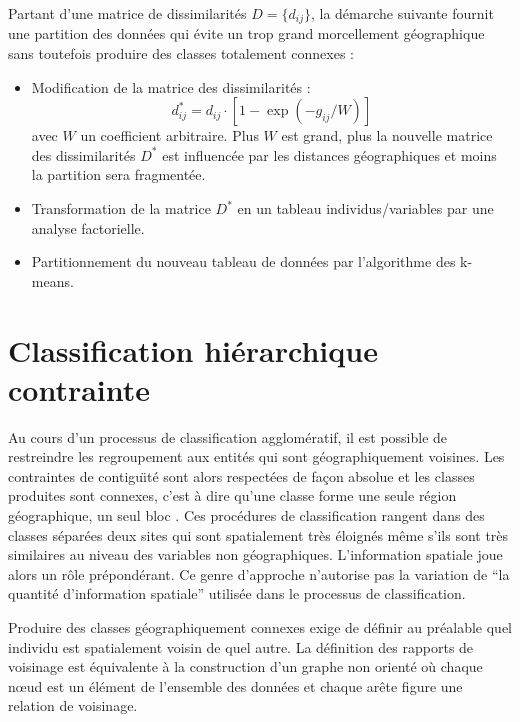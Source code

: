 \begin{ex}\cite{Oliver1989}
Partant d'une matrice de dissimilarit\'es $D=\{d_{ij}\}$, la 
d\'emarche suivante fournit une partition des donn\'ees qui 
\'evite un trop grand morcellement g\'eographique sans toutefois produire
des classes totalement connexes :
\begin{itemize}
\item  Modification de la matrice des dissimilarit\'es : 
\[
d^*_{ij}=d_{ij}\cdot [1-\exp{(-g_{ij}/W)}]
\]
avec $W$ un coefficient arbitraire. Plus $W$ est grand, plus
la nouvelle matrice des dissimilarit\'es $D^*$ est influenc\'ee
par les distances g\'eographiques et moins la partition sera fragment\'ee.

\item Transformation de la matrice $D^*$ en un tableau individus/variables
par une analyse factorielle.

\item Partitionnement du nouveau tableau de donn\'ees par l'algorithme des
k-means. 

\end{itemize}




\end{ex}

  
  

\section{Classification hi\'erarchique contrainte}
Au cours d'un processus de classification agglom\'eratif, il est possible 
de  restreindre les regroupement aux entit\'es qui sont
g\'eographiquement voisines. Les contraintes de contigu\"{\i}t\'e
sont alors respect\'ees de fa\c{c}on absolue et les classes produites
sont connexes, c'est \`a dire qu'une classe forme une seule r\'egion
g\'eographique, un seul bloc \cite{Legendre1987,Lebart1978,Openshaw1977}.
Ces proc\'edures de classification rangent dans des classes s\'epar\'ees
deux sites qui sont spatialement tr\`es \'eloign\'es m\^eme s'ils
sont tr\`es similaires au niveau des variables non g\'eographiques. 
L'information spatiale joue alors un r\^ole pr\'epond\'erant.
Ce genre d'approche n'autorise pas la variation de  ``la quantit\'e
d'information spatiale'' utilis\'ee dans le processus de 
classification.

Produire des classes g\'eographiquement connexes exige
de d\'efinir au pr\'ealable quel individu est spatialement voisin de quel autre.
La d\'{e}finition des rapports de voisinage est \'{e}quivalente \`{a} la construction
d'un graphe non orient\'{e} o\`{u} chaque n{\oe}ud est un \'{e}l\'{e}ment de
l'ensemble des donn\'{e}es et chaque ar\^{e}te figure une relation de voisinage.

